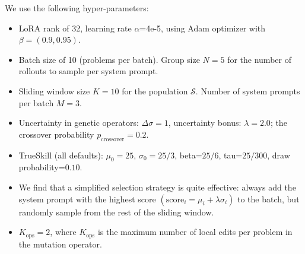 \documentclass{article}
\theoremstyle{plain}
\theoremstyle{definition}
\theoremstyle{remark}
\begin{document}
We use the following hyper-parameters:
\begin{itemize}
    \item LoRA \cite{lora} rank of 32, learning rate $\alpha$=4e-5, using Adam optimizer \cite{kingma2014adam} with $\beta=(0.9, 0.95)$.
    \item Batch size of 10 (problems per batch). Group size $N=5$ for the number of rollouts to sample per system prompt.
    \item Sliding window size $K=10$ for the population $\mathcal{S}$.  Number of system prompts per batch $M=3$.
    \item Uncertainty in genetic operators: $\Delta\sigma=1$, uncertainty bonus: $\lambda=2.0$; the crossover probability $p_{\text{crossover}}=0.2$.
    \item TrueSkill (all defaults): $\mu_{0}=25$, $\sigma_0=25/3$, beta=$25/6$, tau=$25/300$, draw probability=$0.10$.
    \item We find that a simplified selection strategy is quite effective: always add the system prompt with the highest score $(\mathrm{score}_{i} = \mu_{i}+\lambda \sigma_{i})$ to the batch, but randomly sample from the rest of the sliding window.
    \item $K_{\text{ops}}=2$, where $K_{\text{ops}}$ is the maximum number of local edits per problem in the mutation operator.
\end{itemize}
\end{document}
